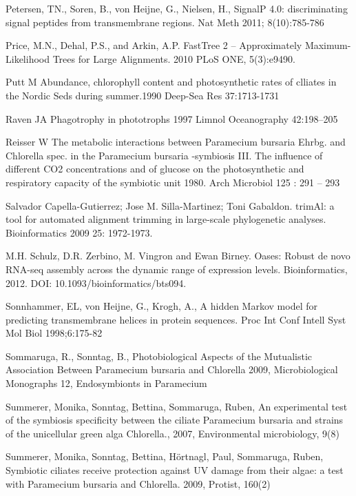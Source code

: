 \documentclass[a4paper,11pt]{article}
\begin{document}
 
\noindent Petersen, TN., Soren, B., von Heijne, G., Nielsen, H., SignalP 4.0: discriminating signal peptides from transmembrane regions. Nat Meth 2011; 8(10):785-786

 
\noindent Price, M.N., Dehal, P.S., and Arkin, A.P. FastTree 2 -- Approximately Maximum-Likelihood Trees for Large Alignments. 2010 PLoS ONE, 5(3):e9490.

 
\noindent Putt M Abundance, chlorophyll content and photosynthetic rates of clliates in the Nordic Seds during summer.1990  Deep-Sea Res 37:1713-1731

 
\noindent Raven JA Phagotrophy in phototrophs 1997 Limnol Oceanography 42:198–205

 
\noindent Reisser W  The metabolic interactions between Paramecium bursaria Ehrbg. and Chlorella spec. in the Paramecium bursaria -symbiosis III. The influence of different CO2 concentrations and of glucose on the photosynthetic and respiratory capacity of the symbiotic unit  1980. Arch Microbiol 125 : 291 – 293

 
\noindent Salvador Capella-Gutierrez; Jose M. Silla-Martinez; Toni Gabaldon. trimAl: a tool for automated alignment trimming in large-scale phylogenetic analyses. Bioinformatics 2009 25: 1972-1973.

 
\noindent M.H. Schulz, D.R. Zerbino, M. Vingron and Ewan Birney. Oases: Robust de novo RNA-seq assembly across the dynamic range of expression levels. Bioinformatics, 2012. DOI: 10.1093/bioinformatics/bts094.

 
\noindent Sonnhammer, EL, von Heijne, G., Krogh, A., A hidden Markov model for predicting transmembrane helices in protein sequences. Proc Int Conf Intell Syst Mol Biol 1998;6:175-82

 
\noindent Sommaruga, R., Sonntag, B., Photobiological Aspects of the Mutualistic Association Between Paramecium bursaria and Chlorella 2009, Microbiological Monographs 12, Endosymbionts in Paramecium

 
\noindent Summerer, Monika, Sonntag, Bettina,  Sommaruga, Ruben,  An experimental test of the symbiosis specificity between the ciliate Paramecium bursaria and strains of the unicellular green alga Chlorella., 2007,  Environmental microbiology, 9(8)

 
\noindent Summerer, Monika, Sonntag, Bettina, Hörtnagl, Paul, Sommaruga, Ruben, Symbiotic ciliates receive protection against UV damage from their algae: a test with Paramecium bursaria and Chlorella. 2009,  Protist, 160(2)
\end{document}
